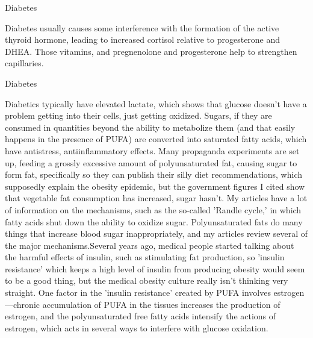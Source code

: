\documentclass[11pt,oneside,openany,extrafontsizes]{memoir}
\begin{document}
\begin{standalonequote}{Diabetes}

    \begin{answer}
        Diabetes usually causes some interference with the formation of the active thyroid hormone, leading to increased cortisol relative to progesterone and DHEA. Those vitamins, and pregnenolone and progesterone help to strengthen capillaries.
    \end{answer}
\end{standalonequote}

\begin{standalonequote}{Diabetes}

    \begin{answer}
        Diabetics typically have elevated lactate, which shows that glucose doesn't have a problem getting into their cells, just getting oxidized. Sugars, if they are consumed in quantities beyond the ability to metabolize them (and that easily happens in the presence of PUFA) are converted into saturated fatty acids, which have antistress, antiinflammatory effects. Many propaganda experiments are set up, feeding a grossly excessive amount of polyunsaturated fat, causing sugar to form fat, specifically so they can publish their silly diet recommendations, which supposedly explain the obesity epidemic, but the government figures I cited show that vegetable fat consumption has increased, sugar hasn't. My articles have a lot of information on the mechanisms, such as the so-called 'Randle cycle,' in which fatty acids shut down the ability to oxidize sugar. Polyunsaturated fats do many things that increase blood sugar inappropriately, and my articles review several of the major mechanisms.Several years ago, medical people started talking about the harmful effects of insulin, such as stimulating fat production, so 'insulin resistance' which keeps a high level of insulin from producing obesity would seem to be a good thing, but the medical obesity culture really isn't thinking very straight. One factor in the 'insulin resistance' created by PUFA involves estrogen---chronic accumulation of PUFA in the tissues increases the production of estrogen, and the polyunsaturated free fatty acids intensify the actions of estrogen, which acts in several ways to interfere with glucose oxidation.
    \end{answer}
\end{standalonequote}
\end{document}
